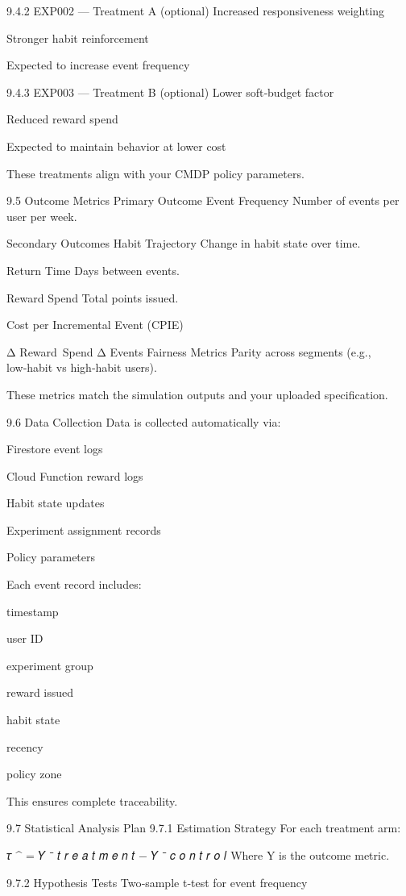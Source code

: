 9.4.2 EXP002 — Treatment A (optional)
Increased responsiveness weighting

Stronger habit reinforcement

Expected to increase event frequency

9.4.3 EXP003 — Treatment B (optional)
Lower soft‑budget factor

Reduced reward spend

Expected to maintain behavior at lower cost

These treatments align with your CMDP policy parameters.

9.5 Outcome Metrics
Primary Outcome
Event Frequency  
Number of events per user per week.

Secondary Outcomes
Habit Trajectory  
Change in habit state over time.

Return Time  
Days between events.

Reward Spend  
Total points issued.

Cost per Incremental Event (CPIE)

Δ
Reward Spend
Δ
Events
Fairness Metrics  
Parity across segments (e.g., low‑habit vs high‑habit users).

These metrics match the simulation outputs and your uploaded specification.

9.6 Data Collection
Data is collected automatically via:

Firestore event logs

Cloud Function reward logs

Habit state updates

Experiment assignment records

Policy parameters

Each event record includes:

timestamp

user ID

experiment group

reward issued

habit state

recency

policy zone

This ensures complete traceability.

9.7 Statistical Analysis Plan
9.7.1 Estimation Strategy
For each treatment arm:

𝜏
^
=
𝑌
ˉ
𝑡
𝑟
𝑒
𝑎
𝑡
𝑚
𝑒
𝑛
𝑡
−
𝑌
ˉ
𝑐
𝑜
𝑛
𝑡
𝑟
𝑜
𝑙
Where Y is the outcome metric.

9.7.2 Hypothesis Tests
Two‑sample t‑test for event frequency

